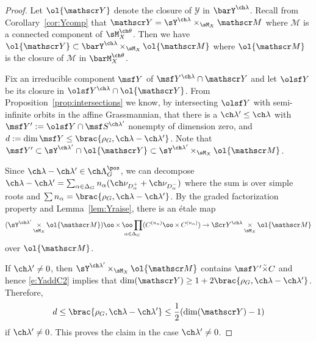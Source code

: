 \documentclass[final]{amsart}
\theoremstyle{remark}
\theoremstyle{definition}
\DeclareMathOperator*{\xt}{\times}
\numberwithin{equation}{section}
\begin{document}
\begin{proof}
Let $\ol{\mathscr Y}$ denote the closure of $\mathscr Y$ in $\barY^{\ch\lambda}$.
Recall from Corollary~\ref{cor:Ycomp} that $\mathscr Y = 
\sY^{\ch\lambda} \times_{\sM_X} \mathscr M$ 
where $\mathscr M$ is a connected component of 
$\sM_X^{\ch\theta}$. 
Then we have $\ol{\mathscr Y} \subset \barY^{\ch\lambda} \xt_{\sM_X} \ol{\mathscr M}$
where $\ol{\mathscr M}$ is the closure of $\mathscr M$ in $\barM_X^{\ch\theta}$.



Fix an irreducible component $\msf Y$ of 
$\msf Y^{\ch\lambda}\cap \mathscr Y$ and let $\olsf Y$ be its closure in 
$\olsf Y^{\ch\lambda} \cap \ol{\mathscr Y}$. 
From Proposition~\ref{prop:intersections} we know, by intersecting $\olsf Y$ with semi-infinite orbits in the affine Grassmannian, that there is a $\ch\lambda'\le \ch\lambda$ with $\msf Y':= \olsf Y \cap \msf S^{\ch\lambda'}$ nonempty of dimension zero, and $d:=\dim \msf Y \le \brac{ \rho_G, \ch\lambda-\ch\lambda'}$. 
Note that $\msf Y' \subset \sY^{\ch\lambda'} \cap \ol{\mathscr Y}
\subset \sY^{\ch\lambda'} \xt_{\sM_X} \ol{\mathscr M}$.


Since $\ch\lambda - \ch\lambda' \in \ch\Lambda^\pos_G$, we can decompose 
$\ch\lambda - \ch\lambda' = \sum_{\alpha\in \Delta_G} n_\alpha (\ch\nu_{D^+_\alpha}+\ch\nu_{D^-_\alpha})$
where the sum is over simple roots and 
$\sum n_\alpha = \brac{\rho_G,\ch\lambda-\ch\lambda'}$. 
By the graded factorization property and Lemma~\ref{lem:Yraise}, there is an \'etale map 
\begin{equation} \label{e:YaddC2}
    (\sY^{\ch\lambda'} \xt_{\sM_X} \ol{\mathscr M}) \oo\xt 
    \underset{\alpha \in \Delta_G}{\oo\prod} (C^{(n_\alpha)}\oo\xt C^{(n_\alpha)}) 
    \to
    \Scr Y^{\ch\lambda} \xt_{\sM_X} \ol{\mathscr M}
\end{equation}
over $\ol{\mathscr M}$. 

If $\ch\lambda' \ne 0$, then $\sY^{\ch\lambda'} \xt_{\sM_X} \ol{\mathscr M}$
contains $\msf Y' \tilde\times C$ and hence 
\eqref{e:YaddC2} implies that 
$\dim (\mathscr Y) \ge 1+2\brac{\rho_G,\ch\lambda-\ch\lambda'}$.
Therefore, 
\begin{equation} \label{e:MVineq}
d\le     \brac{\rho_G,\ch\lambda-\ch\lambda'} \le \frac 1 2 (\dim (\mathscr Y) - 1)
\end{equation}
if $\ch\lambda'\ne 0$. 
This proves the
claim in the case $\ch\lambda' \ne 0$. 


\end{proof}
\end{document}
